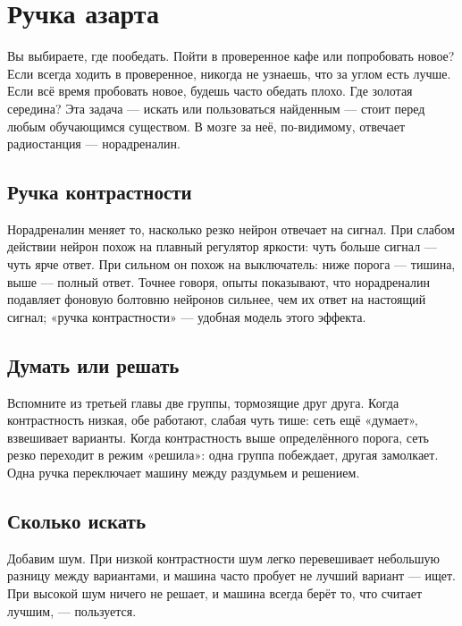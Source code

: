 \chapter{Ручка азарта}

Вы выбираете, где пообедать. Пойти в проверенное кафе или попробовать новое? Если всегда ходить в проверенное, никогда не узнаешь, что за углом есть лучше. Если всё время пробовать новое, будешь часто обедать плохо. Где золотая середина? Эта задача --- искать или пользоваться найденным --- стоит перед любым обучающимся существом. В мозге за неё, по-видимому, отвечает радиостанция  --- норадреналин.

\section*{Ручка контрастности}

Норадреналин меняет то, насколько резко нейрон отвечает на сигнал. При слабом действии нейрон похож на плавный регулятор яркости: чуть больше сигнал --- чуть ярче ответ. При сильном он похож на выключатель: ниже порога --- тишина, выше --- полный ответ. Точнее говоря, опыты показывают, что норадреналин подавляет фоновую болтовню нейронов сильнее, чем их ответ на настоящий сигнал; «ручка контрастности» --- удобная модель этого эффекта.


\section*{Думать или решать}

Вспомните из третьей главы две группы, тормозящие друг друга. Когда контрастность низкая, обе работают, слабая чуть тише: сеть ещё «думает», взвешивает варианты. Когда контрастность выше определённого порога, сеть резко переходит в режим «решила»: одна группа побеждает, другая замолкает. Одна ручка переключает машину между раздумьем и решением.

\section*{Сколько искать}

Добавим шум. При низкой контрастности шум легко перевешивает небольшую разницу между вариантами, и машина часто пробует не лучший вариант --- ищет. При высокой шум ничего не решает, и машина всегда берёт то, что считает лучшим, --- пользуется.

